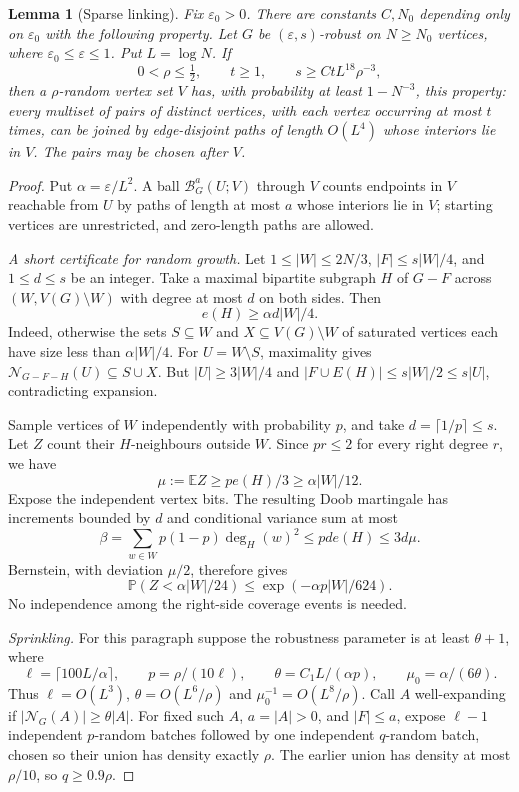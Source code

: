 \documentclass[11pt]{article}
\newtheorem{lemma}[theorem]{Lemma}
\theoremstyle{remark}\newtheorem*{remark}{Remark}
\newcommand{\E}{\mathbb E}
\newcommand{\Prob}{\mathbb P}
\newcommand{\eps}{\varepsilon}
\newcommand{\NN}{\mathcal N}
\begin{document}
\begin{lemma}[Sparse linking]\label{lem:link}
Fix $\eps_0>0$. There are constants $C,N_0$ depending only on $\eps_0$
with the following property. Let $G$ be $(\eps,s)$-robust on $N\ge N_0$
vertices, where $\eps_0\le\eps\le1$. Put $L=\log N$. If
\[
 0<\rho\le\tfrac12,\qquad t\ge1,\qquad
 s\ge CtL^{18}\rho^{-3},
\]
then a $\rho$-random vertex set $V$ has, with probability at least
$1-N^{-3}$, this property: every multiset of pairs of distinct vertices,
with each vertex occurring at most $t$ times, can be joined by
edge-disjoint paths of length $O(L^4)$ whose interiors lie in $V$.
The pairs may be chosen after $V$.
\end{lemma}
\begin{proof}
Put $\alpha=\eps/L^2$. A ball $\mathcal B_G^a(U;V)$ through $V$
counts endpoints in $V$ reachable from $U$ by paths of length at most
$a$ whose interiors lie in $V$; starting vertices are unrestricted,
and zero-length paths are allowed.

\emph{A short certificate for random growth.}
Let $1\le|W|\le2N/3$, $|F|\le s|W|/4$, and $1\le d\le s$ be an
integer. Take a maximal bipartite subgraph $H$ of $G-F$ across
$(W,V(G)\setminus W)$ with degree at most $d$ on both sides. Then
\begin{equation}\label{eq:certificate}
 e(H)\ge\alpha d|W|/4.
\end{equation}
Indeed, otherwise the sets $S\subseteq W$ and $X\subseteq V(G)\setminus W$
of saturated vertices each have size less than $\alpha|W|/4$.
For $U=W\setminus S$, maximality gives
$\NN_{G-F-H}(U)\subseteq S\cup X$. But $|U|\ge3|W|/4$ and
$|F\cup E(H)|\le s|W|/2\le s|U|$, contradicting expansion.

Sample vertices of $W$ independently with probability $p$, and take
$d=\lceil1/p\rceil\le s$. Let $Z$ count their $H$-neighbours outside $W$.
Since $pr\le2$ for every right degree $r$, we have
\[
 \mu:=\E Z\ge pe(H)/3\ge\alpha|W|/12.
\]
Expose the independent vertex bits. The resulting Doob martingale has
increments bounded by $d$ and conditional variance sum at most
\[
 \beta=\sum_{w\in W}p(1-p)\deg_H(w)^2
 \le pd e(H)\le3d\mu.
\]
Bernstein, with deviation $\mu/2$, therefore gives
\begin{equation}\label{eq:growth}
 \Prob(Z<\alpha|W|/24)\le\exp(-\alpha p|W|/624).
\end{equation}
No independence among the right-side coverage events is needed.

\emph{Sprinkling.}
For this paragraph suppose the robustness parameter is at least
$\theta+1$, where
\[
 \ell=\lceil100L/\alpha\rceil,\qquad p=\rho/(10\ell),\qquad
 \theta=C_1L/(\alpha p),\qquad \mu_0=\alpha/(6\theta).
\]
Thus $\ell=O(L^3)$, $\theta=O(L^6/\rho)$ and
$\mu_0^{-1}=O(L^8/\rho)$.
Call $A$ well-expanding if $|\NN_G(A)|\ge\theta|A|$.
For fixed such $A$, $a=|A|>0$, and $|F|\le a$, expose $\ell-1$
independent $p$-random batches followed by one independent $q$-random
batch, chosen so their union has density exactly $\rho$.
The earlier union has density at most $\rho/10$, so $q\ge0.9\rho$.


\end{proof}
\end{document}

